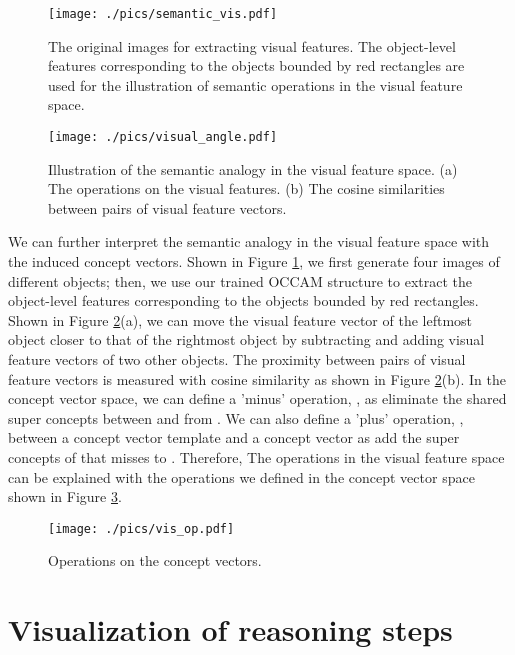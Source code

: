 \documentclass[10pt,twocolumn,letterpaper]{article}
\begin{document}
\begin{figure}
\centering
\texttt{[image: ./pics/semantic\_vis.pdf]}
\caption{The original images for extracting visual features. The object-level features corresponding to the objects bounded by red rectangles are used for the illustration of semantic operations in the visual feature space. }
\label{semantic_vis}
\end{figure}

\begin{figure}
\centering
\texttt{[image: ./pics/visual\_angle.pdf]}
\caption{Illustration of the semantic analogy in the visual feature space. (a) The operations on the visual features. (b) The cosine similarities between pairs of visual feature vectors. }
\label{visual_angle}
\end{figure}

We can further interpret the semantic analogy in the visual feature space with the induced concept vectors. Shown in Figure \ref{semantic_vis}, we first generate four images of different objects; then, we use our trained OCCAM structure to extract the object-level features corresponding to the objects bounded by red rectangles. Shown in Figure \ref{visual_angle}(a), we can move the visual feature vector of the leftmost object closer to that of the rightmost object by subtracting and adding visual feature vectors of two other objects. The proximity between pairs of visual feature vectors is measured with cosine similarity as shown in Figure \ref{visual_angle}(b). In the concept vector space, we can define a 'minus' operation, , as eliminate the shared super concepts between  and  from . We can also define a 'plus' operation, , between a concept vector template  and a concept vector  as add the super concepts of  that  misses to . Therefore, The operations in the visual feature space can be explained with the operations we defined in the concept vector space shown in Figure \ref{vis_op}.




\begin{figure}
\centering
\texttt{[image: ./pics/vis\_op.pdf]}
\caption{Operations on the concept vectors.}
\label{vis_op}
\end{figure}

\section{Visualization of reasoning steps}
\label{app:vis_concept_reasoning}
\end{document}
